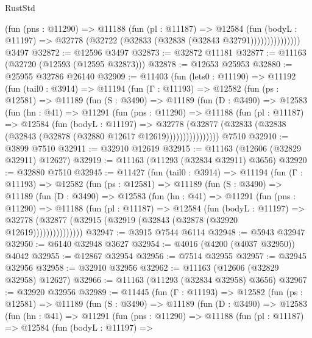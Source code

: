\begin{lexlean}{RustStd}
\begin{coremodule}
                    (fun (pns : @11290) =>
                    @11188
                      (fun (pl : @11187) =>
                      @12584
                        (fun (bodyL : @11197) =>
                        @32778 (@32722 (@32833 (@32838 (@32843 @32791)))))))))))))))
    @3497
@32872 := @12596 @3497
@32873 := @32872 @11181
@32877 := @11163 (@32720 (@12593 (@12595 @32873)))
@32878 := @12653 @25953
@32880 := @25955 @32786 @26140
@32909 := @11403
    (fun (lets0 : @11190) =>
    @11192
      (fun (tail0 : @3914) =>
      @11194
        (fun (Γ : @11193) =>
        @12582
          (fun (ps : @12581) =>
          @11189
            (fun (S : @3490) =>
            @11189
              (fun (D : @3490) =>
              @12583
                (fun (hn : @41) =>
                @11291
                  (fun (pns : @11290) =>
                  @11188
                    (fun (pl : @11187) =>
                    @12584
                      (fun (bodyL : @11197) =>
                      @32778
                        (@32877
                          (@32833 (@32838 (@32843 (@32878 (@32880 @12617 @12619))))))))))))))))
    @7510
@32910 := @3899 @7510
@32911 := @32910 @12619
@32915 := @11163 (@12606 (@32829 @32911) @12627)
@32919 := @11163 (@11293 (@32834 @32911) @3656)
@32920 := @32880 @7510
@32945 := @11427
    (fun (tail0 : @3914) =>
    @11194
      (fun (Γ : @11193) =>
      @12582
        (fun (ps : @12581) =>
        @11189
          (fun (S : @3490) =>
          @11189
            (fun (D : @3490) =>
            @12583
              (fun (hn : @41) =>
              @11291
                (fun (pns : @11290) =>
                @11188
                  (fun (pl : @11187) =>
                  @12584
                    (fun (bodyL : @11197) =>
                    @32778 (@32877 (@32915 (@32919 (@32843 (@32878 (@32920 @12619)))))))))))))))
@32947 := @3915 @7544 @6114
@32948 := @5943 @32947
@32950 := @6140 @32948 @3627
@32954 := @4016 (@4200 (@4037 @32950)) @4042
@32955 := @12867 @32954
@32956 := @7514 @32955
@32957 := @32945 @32956
@32958 := @32910 @32956
@32962 := @11163 (@12606 (@32829 @32958) @12627)
@32966 := @11163 (@11293 (@32834 @32958) @3656)
@32967 := @32920 @32956
@32989 := @11445
    (fun (Γ : @11193) =>
    @12582
      (fun (ps : @12581) =>
      @11189
        (fun (S : @3490) =>
        @11189
          (fun (D : @3490) =>
          @12583
            (fun (hn : @41) =>
            @11291
              (fun (pns : @11290) =>
              @11188
                (fun (pl : @11187) =>
                @12584
                  (fun (bodyL : @11197) =>

\end{coremodule}
\end{lexlean}

